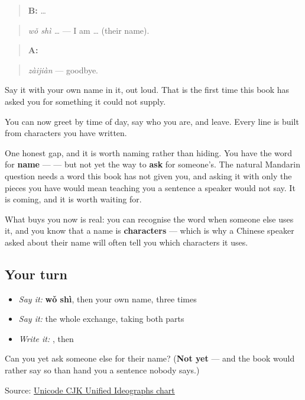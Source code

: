 \begin{quote}
\textbf{B:}  …
\end{quote}

\begin{quote}
\emph{wǒ shì …} — I am … (their name).
\end{quote}

\begin{quote}
\textbf{A:} 
\end{quote}

\begin{quote}
\emph{zàijiàn} — goodbye.
\end{quote}

Say it with your own name in it, out loud. That is the first time this book has asked you for something it could not supply.

\begin{grammarlens}[title={What you've built — and one thing deliberately withheld}]
You can now greet by time of day, say who you are, and leave. Every line is built from characters you have written.

One honest gap, and it is worth naming rather than hiding. You have the word for \textbf{name} —  — but not yet the way to \textbf{ask} for someone's. The natural Mandarin question needs a word this book has not given you, and asking it with only the pieces you have would mean teaching you a sentence a speaker would not say. It is coming, and it is worth waiting for.

What  buys you now is real: you can recognise the word when someone else uses it, and you know that a name is \textbf{characters} — which is why a Chinese speaker asked about their name will often tell you which characters it uses.
\end{grammarlens}

\subsection*{Your turn}
\begin{itemize}
\raggedright
  \item \emph{Say it:} \textbf{wǒ shì}, then your own name, three times
  \item \emph{Say it:} the whole exchange, taking both parts
  \item \emph{Write it:} , then 
\end{itemize}

\begin{tcolorbox}[breakable,colback=teal!4,colframe=teal!35!black,title={Before you move on}]
Can you yet ask someone else for their name? (\textbf{Not yet} — and the book would rather say so than hand you a sentence nobody says.)

Source: \href{https://www.unicode.org/charts/PDF/U4E00.pdf}{Unicode CJK Unified Ideographs chart}
\end{tcolorbox}
